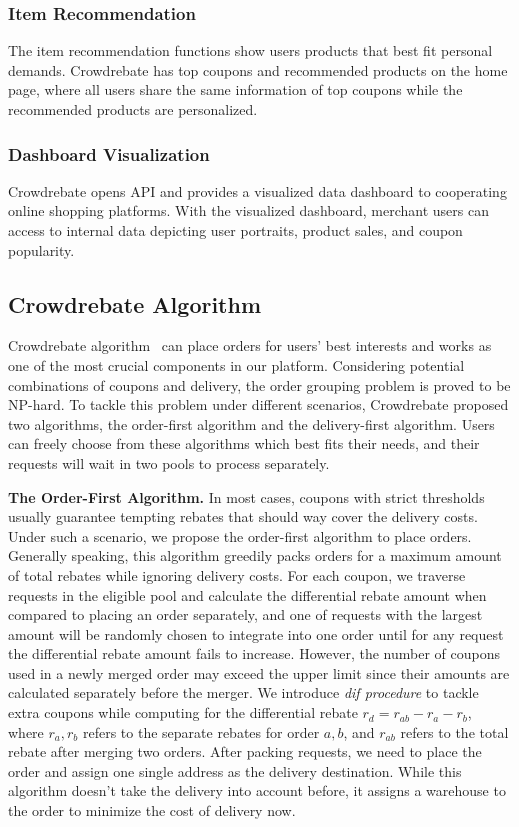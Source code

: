 \subsubsection{Item Recommendation}

The item recommendation functions show users products that best ﬁt personal demands. Crowdrebate has top coupons and recommended products on the home page, where all users share the same information of top coupons while the recommended products are personalized.

\subsubsection{Dashboard Visualization}

Crowdrebate opens API and provides a visualized data dashboard to cooperating online shopping platforms. With the visualized dashboard, merchant users can access to internal data depicting user portraits, product sales, and coupon popularity.

\subsection{Crowdrebate Algorithm}

Crowdrebate algorithm~\cite{Report} can place orders for users' best interests and works as one of the most crucial components in our platform. Considering potential combinations of coupons and delivery, the order grouping problem is proved to be NP-hard. To tackle this problem under different scenarios, Crowdrebate proposed two algorithms, the order-first algorithm and the delivery-first algorithm. Users can freely choose from these algorithms which best fits their needs, and their requests will wait in two pools to process separately.

\textbf{The Order-First Algorithm.} In most cases, coupons with strict thresholds usually guarantee tempting rebates that should way cover the delivery costs. Under such a scenario, we propose the order-first algorithm to place orders. Generally speaking, this algorithm greedily packs orders for a maximum amount of total rebates while ignoring delivery costs. For each coupon, we traverse requests in the eligible pool and calculate the differential rebate amount when compared to placing an order separately, and one of requests with the largest amount will be randomly chosen to integrate into one order until for any request the differential rebate amount fails to increase. However, the number of coupons used in a newly merged order may exceed the upper limit since their amounts are calculated separately before the merger. We introduce \emph{dif procedure} to tackle extra coupons while computing for the differential rebate $r_d=r_{ab}-r_a-r_b$, where 
$r_a, r_b$ refers to the separate rebates for order $a, b$, and $r_{ab}$ refers to the total rebate after merging two orders. After packing requests, we need to place the order and assign one single address as the delivery destination. While this algorithm doesn't take the delivery into account before, it assigns a warehouse to the order to minimize the cost of delivery now.


